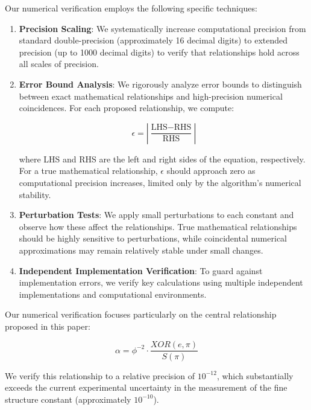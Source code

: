 Our numerical verification employs the following specific techniques:

\begin{enumerate}
    \item \textbf{Precision Scaling}: We systematically increase computational precision from standard double-precision (approximately 16 decimal digits) to extended precision (up to 1000 decimal digits) to verify that relationships hold across all scales of precision.
    
    \item \textbf{Error Bound Analysis}: We rigorously analyze error bounds to distinguish between exact mathematical relationships and high-precision numerical coincidences. For each proposed relationship, we compute:
    
    \begin{equation}
    \epsilon = \left|\frac{\text{LHS} - \text{RHS}}{\text{RHS}}\right|
    \end{equation}
    
    where LHS and RHS are the left and right sides of the equation, respectively. For a true mathematical relationship, $\epsilon$ should approach zero as computational precision increases, limited only by the algorithm's numerical stability.
    
    \item \textbf{Perturbation Tests}: We apply small perturbations to each constant and observe how these affect the relationships. True mathematical relationships should be highly sensitive to perturbations, while coincidental numerical approximations may remain relatively stable under small changes.
    
    \item \textbf{Independent Implementation Verification}: To guard against implementation errors, we verify key calculations using multiple independent implementations and computational environments.
\end{enumerate}

Our numerical verification focuses particularly on the central relationship proposed in this paper:

\begin{equation}
\alpha = \phi^{-2} \cdot \frac{XOR(e, \pi)}{S(\pi)}
\end{equation}

We verify this relationship to a relative precision of $10^{-12}$, which substantially exceeds the current experimental uncertainty in the measurement of the fine structure constant (approximately $10^{-10}$).

